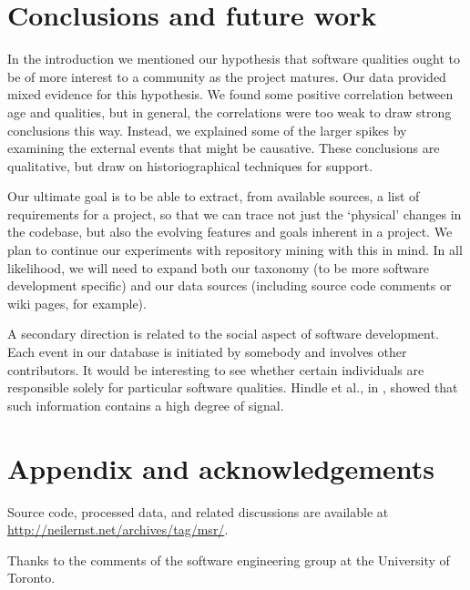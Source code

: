 \documentclass[conference, compsoc]{IEEEtran}
\begin{document}
\section{Conclusions and future work}
In the introduction we mentioned our hypothesis that software qualities ought to be of more interest to a community as the project matures. Our data provided mixed evidence for this hypothesis. We found some positive correlation between age and qualities, but in general, the correlations were too weak to draw strong conclusions this way. Instead, we explained some of the larger spikes by examining the external events that might be causative. These conclusions are qualitative, but draw on historiographical techniques for support.

Our ultimate goal is to be able to extract, from available sources, a list of requirements for a project, so that we can trace not just the `physical' changes in the codebase, but also the evolving features and goals inherent in a project. We plan to continue our experiments with repository mining with this in mind. In all likelihood, we will need to expand both our taxonomy (to be more software development specific) and our data sources (including source code comments or wiki pages, for example).

A secondary direction is related to the social aspect of software development. Each event in our database is initiated by somebody and involves other contributors. It would be interesting to see whether certain individuals are responsible solely for particular software qualities. Hindle et al., in \cite{hindle09icpc}, showed that such information contains a high degree of signal.

\section{Appendix and acknowledgements}
\label{appendix}
Source code, processed data, and related discussions are available at \url{http://neilernst.net/archives/tag/msr/}.

Thanks to the comments of the software engineering group at the University of Toronto.
\begin{footnotesize}

\end{footnotesize}
\end{document}
